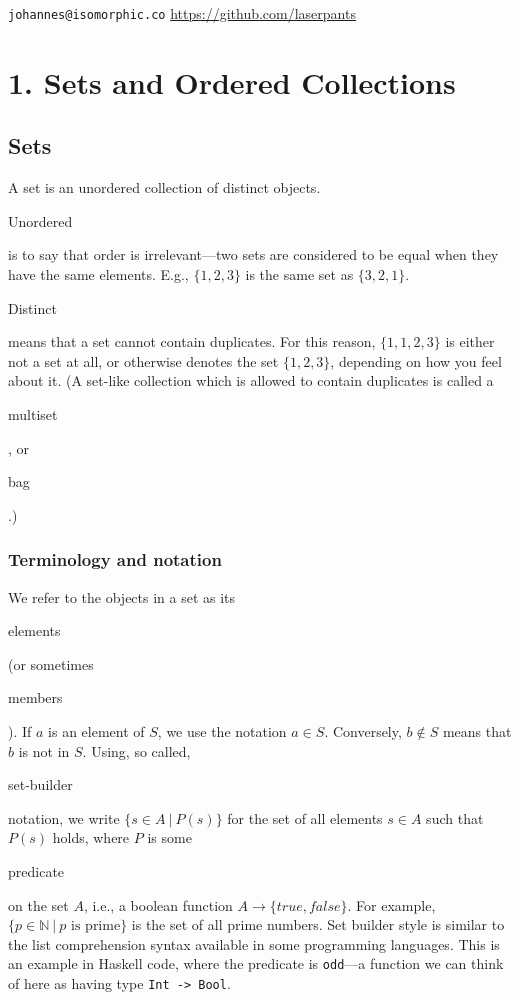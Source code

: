 \documentclass[11pt]{article}
\theoremstyle{plain}
\theoremstyle{definition}
\begin{document}
 
\noindent \verb|johannes@isomorphic.co| \hfill \url{https://github.com/laserpants} 

\section*{1. Sets and Ordered Collections}

\subsection*{Sets}

A set is an unordered collection of distinct objects. \begin{em}Unordered\end{em} is to say that order is irrelevant---two sets are considered to be equal when they have the same elements. E.g., $ \{ 1, 2, 3 \} $ is the same set as $ \{ 3, 2, 1 \} $. \begin{em}Distinct\end{em} means that a set cannot contain duplicates. For this reason, $ \{ 1, 1, 2, 3 \} $ is either not a set at all, or otherwise denotes the set $ \{ 1, 2, 3 \} $, depending on how you feel about it. (A set-like collection which is allowed to contain duplicates is called a \begin{em}multiset\end{em}, or \begin{em}bag\end{em}.) 

\subsubsection*{Terminology and notation}

We refer to the objects in a set as its \begin{em}elements\end{em} (or sometimes \begin{em}members\end{em}). If $ a $ is an element of $ S $, we use the notation $ a \in S $. Conversely, $ b \notin S $ means that $ b $ is not in $ S $. Using, so called, \begin{em}set-builder\end{em} notation, we write $ \{ s \in A \ | \ P(s) \} $ for the set of all elements $ s \in A $ such that $ P(s) $ holds, where $ P $ is some \begin{em}predicate\end{em} on the set $ A $, i.e., a boolean function $ A \rightarrow \{ true, false \} $. For example, $ \{ p \in \mathbb{N} \ | \ p \text{ is prime} \} $ is the set of all prime numbers. Set builder style is similar to the list comprehension syntax available in some programming languages. This is an example in Haskell code, where the predicate is \verb|odd|---a function we can think of here as having type \verb|Int -> Bool|.
\end{document}
